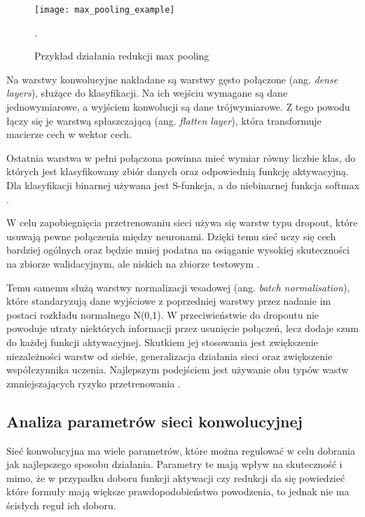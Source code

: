 {\begin{figure}[h]
	\centering
	\centering
		\texttt{[image: max\_pooling\_example]}	
	\caption{Przykład działania redukcji max pooling}.
	\label{fig:max_pooling_example}
\end{figure}


Na warstwy konwolucyjne nakładane są warstwy gęsto połączone (ang. \textit{dense layers}), służące do klasyfikacji. Na  ich wejściu wymagane są dane jednowymiarowe, a wyjściem konwolucji są dane trójwymiarowe. Z tego powodu łączy się je warstwą spłaszczającą (ang. \textit{flatten layer}), która transformuje macierze cech w wektor cech.

Ostatnia warstwa w pełni połączona powinna mieć wymiar równy liczbie klas, do których jest klasyfikowany zbiór danych oraz odpowiednią funkcję aktywacyjną. Dla klasyfikacji binarnej używana jest S-funkcja, a do niebinarnej funkcja softmax \cite{Chollet2017DeepLW}.

W celu zapobiegnięcia przetrenowaniu sieci używa się warstw typu dropout, które usuwają pewne połączenia między neuronami. Dzięki temu sieć uczy się cech bardziej ogólnych oraz będzie mniej podatna na osiąganie wysokiej skuteczności na zbiorze walidacyjnym, ale niskich na zbiorze testowym \cite{Srivastava2014DropoutAS}.

Temu samemu służą warstwy normalizacji wsadowej (ang. \textit{batch normalisation}), które standaryzują dane wyjściowe z poprzedniej warstwy przez nadanie im postaci rozkładu normalnego N(0,1). W przeciwieństwie do dropoutu nie powoduje utraty niektórych informacji przez usunięcie połączeń, lecz dodaje szum do każdej funkcji aktywacyjnej. Skutkiem jej stosowania jest zwiększenie niezależności warstw od siebie, generalizacja działania sieci oraz zwiększenie współczynnika uczenia. Najlepszym podejściem jest używanie obu typów wastw zmniejszających ryzyko przetrenowania \cite{Ioffe2015BatchNA}.
}

\subsection{Analiza parametrów sieci konwolucyjnej}

Sieć konwolucyjna ma wiele parametrów, które można regulować w celu dobrania jak najlepszego sposobu działania. Parametry te mają wpływ na skuteczność i mimo, że w przypadku doboru funkcji aktywacji czy redukcji da się powiedzieć które formuły mają większe prawdopodobieństwo powodzenia, to jednak nie ma ścisłych reguł ich doboru.

